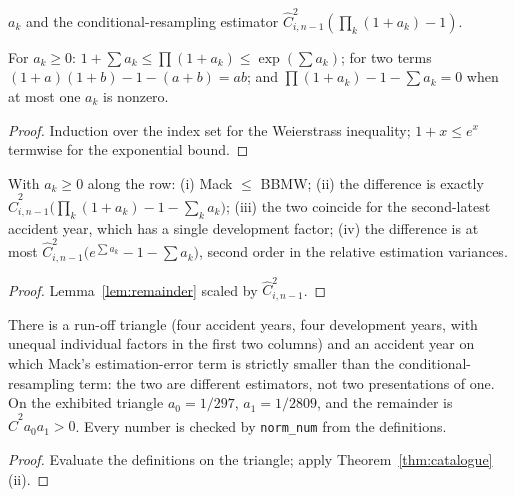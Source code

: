 \begin{definition}\label{def:bbmw}\leanok
{}
$a_k$ and the conditional-resampling estimator $\hat C_{i,n-1}^2(\prod_k (1+a_k) - 1)$.
\end{definition}

\begin{lemma}\label{lem:remainder}\leanok
For $a_k \ge 0$: $1 + \sum a_k \le \prod (1+a_k) \le \exp(\sum a_k)$; for two terms
$(1+a)(1+b) - 1 - (a+b) = ab$; and $\prod(1+a_k) - 1 - \sum a_k = 0$ when at most one $a_k$ is
nonzero.
\end{lemma}
\begin{proof}\leanok Induction over the index set for the Weierstrass inequality; $1 + x \le e^x$ termwise for the exponential bound. \end{proof}

\begin{theorem}\label{thm:catalogue}\leanok
{}
With $a_k \ge 0$ along the row: (i) Mack $\le$ BBMW; (ii) the difference is exactly
$\hat C_{i,n-1}^2\big(\prod_k(1+a_k) - 1 - \sum_k a_k\big)$; (iii) the two coincide for the
second-latest accident year, which has a single development factor; (iv) the difference is at most
$\hat C_{i,n-1}^2\big(e^{\sum a_k} - 1 - \sum a_k\big)$, second order in the relative estimation
variances.
\end{theorem}
\begin{proof}\leanok Lemma~\ref{lem:remainder} scaled by $\hat C_{i,n-1}^2$. \end{proof}

\begin{theorem}\label{thm:counterexample}\leanok
{}
There is a run-off triangle (four accident years, four development years, with unequal individual
factors in the first two columns) and an accident year on which Mack's estimation-error term is
strictly smaller than the conditional-resampling term: the two are different estimators, not two
presentations of one. On the exhibited triangle $a_0 = 1/297$, $a_1 = 1/2809$, and the remainder
is $\hat C^2 a_0 a_1 > 0$. Every number is checked by \texttt{norm\_num} from the definitions.
\end{theorem}
\begin{proof}\leanok Evaluate the definitions on the triangle; apply Theorem~\ref{thm:catalogue}(ii). \end{proof}

